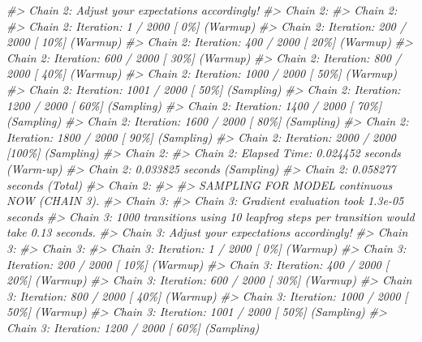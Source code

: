 \documentclass[10pt,a4paper,onecolumn]{article}
\newenvironment{Shaded}{\begin{snugshade}}{\end{snugshade}}
\newcommand{\CommentTok}[1]{\textcolor[rgb]{0.56,0.35,0.01}{\textit{#1}}}
\begin{document}
\begin{Shaded}
\begin{Highlighting}[]
\CommentTok{\#\textgreater{} Chain 2: Adjust your expectations accordingly!}
\CommentTok{\#\textgreater{} Chain 2: }
\CommentTok{\#\textgreater{} Chain 2: }
\CommentTok{\#\textgreater{} Chain 2: Iteration:    1 / 2000 [  0\%]  (Warmup)}
\CommentTok{\#\textgreater{} Chain 2: Iteration:  200 / 2000 [ 10\%]  (Warmup)}
\CommentTok{\#\textgreater{} Chain 2: Iteration:  400 / 2000 [ 20\%]  (Warmup)}
\CommentTok{\#\textgreater{} Chain 2: Iteration:  600 / 2000 [ 30\%]  (Warmup)}
\CommentTok{\#\textgreater{} Chain 2: Iteration:  800 / 2000 [ 40\%]  (Warmup)}
\CommentTok{\#\textgreater{} Chain 2: Iteration: 1000 / 2000 [ 50\%]  (Warmup)}
\CommentTok{\#\textgreater{} Chain 2: Iteration: 1001 / 2000 [ 50\%]  (Sampling)}
\CommentTok{\#\textgreater{} Chain 2: Iteration: 1200 / 2000 [ 60\%]  (Sampling)}
\CommentTok{\#\textgreater{} Chain 2: Iteration: 1400 / 2000 [ 70\%]  (Sampling)}
\CommentTok{\#\textgreater{} Chain 2: Iteration: 1600 / 2000 [ 80\%]  (Sampling)}
\CommentTok{\#\textgreater{} Chain 2: Iteration: 1800 / 2000 [ 90\%]  (Sampling)}
\CommentTok{\#\textgreater{} Chain 2: Iteration: 2000 / 2000 [100\%]  (Sampling)}
\CommentTok{\#\textgreater{} Chain 2: }
\CommentTok{\#\textgreater{} Chain 2:  Elapsed Time: 0.024452 seconds (Warm{-}up)}
\CommentTok{\#\textgreater{} Chain 2:                0.033825 seconds (Sampling)}
\CommentTok{\#\textgreater{} Chain 2:                0.058277 seconds (Total)}
\CommentTok{\#\textgreater{} Chain 2: }
\CommentTok{\#\textgreater{} }
\CommentTok{\#\textgreater{} SAMPLING FOR MODEL \textquotesingle{}continuous\textquotesingle{} NOW (CHAIN 3).}
\CommentTok{\#\textgreater{} Chain 3: }
\CommentTok{\#\textgreater{} Chain 3: Gradient evaluation took 1.3e{-}05 seconds}
\CommentTok{\#\textgreater{} Chain 3: 1000 transitions using 10 leapfrog steps per transition would take 0.13 seconds.}
\CommentTok{\#\textgreater{} Chain 3: Adjust your expectations accordingly!}
\CommentTok{\#\textgreater{} Chain 3: }
\CommentTok{\#\textgreater{} Chain 3: }
\CommentTok{\#\textgreater{} Chain 3: Iteration:    1 / 2000 [  0\%]  (Warmup)}
\CommentTok{\#\textgreater{} Chain 3: Iteration:  200 / 2000 [ 10\%]  (Warmup)}
\CommentTok{\#\textgreater{} Chain 3: Iteration:  400 / 2000 [ 20\%]  (Warmup)}
\CommentTok{\#\textgreater{} Chain 3: Iteration:  600 / 2000 [ 30\%]  (Warmup)}
\CommentTok{\#\textgreater{} Chain 3: Iteration:  800 / 2000 [ 40\%]  (Warmup)}
\CommentTok{\#\textgreater{} Chain 3: Iteration: 1000 / 2000 [ 50\%]  (Warmup)}
\CommentTok{\#\textgreater{} Chain 3: Iteration: 1001 / 2000 [ 50\%]  (Sampling)}
\CommentTok{\#\textgreater{} Chain 3: Iteration: 1200 / 2000 [ 60\%]  (Sampling)}

\end{Highlighting}
\end{Shaded}
\end{document}
